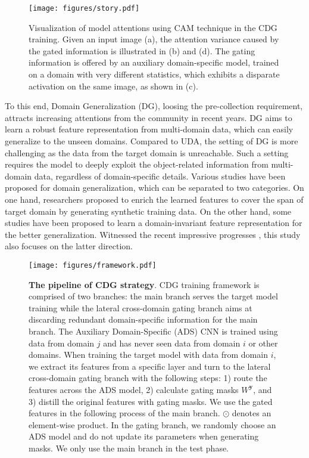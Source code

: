 \begin{figure}
  \centering
  \texttt{[image: figures/story.pdf]}
  \caption{Visualization of model attentions using CAM technique in the CDG training. Given an input image (a), the attention variance caused by the gated information is illustrated in (b) and (d). The gating information is offered by an auxiliary domain-specific model, trained on a domain with very different statistics, which exhibits a disparate activation on the same image, as shown in (c).}
  \label{fig:story}
\end{figure}

To this end, Domain Generalization (DG), loosing the pre-collection requirement, attracts increasing attentions from the community in recent years. DG aims to learn a robust feature representation from multi-domain data, which can easily generalize to the unseen domains. Compared to UDA, the setting of DG is more challenging as the data from the target domain is unreachable. Such a setting requires the model to deeply exploit the object-related information from multi-domain data, regardless of domain-specific details. Various studies have been proposed for domain generalization, which can be separated to two categories. On one hand, researchers \citep{zakharov2019deceptionnet, yue2019domain} proposed to enrich the learned features to cover the span of target domain by generating synthetic training data. On the other hand, some studies \citep{muandet2013domain, wang2019learning} have been proposed to learn a domain-invariant feature representation for the better generalization. Witnessed the recent impressive progresses \citep{huangRSC2020, li2019episodic}, this study also focuses on the latter direction.

\begin{figure*}
  \centering
  \texttt{[image: figures/framework.pdf]}
  \caption{{\bf The pipeline of CDG strategy}. CDG training framework is comprised of two branches: the main branch serves the target model training while the lateral cross-domain gating branch aims at discarding redundant domain-specific information for the main branch. The Auxiliary Domain-Specific (ADS) CNN is trained using data from domain $j$ and has never seen data from domain $i$ or other domains. When training the target model with data from domain $i$, we extract its features from a specific layer and turn to the lateral cross-domain gating branch with the following steps: 1) route the features across the ADS model, 2) calculate gating masks $W^\mathbf{y}$, and 3) distill the original features with gating masks. We use the gated features in the following process of the main branch. $\odot$ denotes an element-wise product. In the gating branch, we randomly choose an ADS model and do not update its parameters when generating masks. We only use the main branch in the test phase.}
  \label{fig:framework}
\end{figure*}

